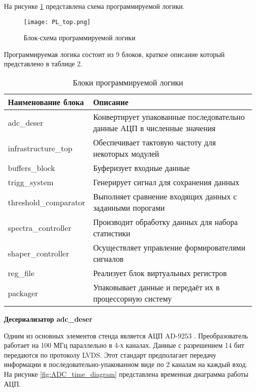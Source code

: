 На рисунке \ref{fig:PL_top} представлена схема программируемой логики.\par 
\begin{figure}[ht]
    \centering
    \texttt{[image: PL\_top.png]}
    \caption{Блок-схема программируемой логики}
    \label{fig:PL_top}
\end{figure}
Программируемая логика состоит из 9 блоков, краткое описание который представлено в таблице 2.\par%
\begin{table}[ht] \label{tab:PL_top_blocks}
    \caption{Блоки программируемой логики}
    \begin{tabular}{|p{}|p{}|}
        \hline
        Наименование блока & Описание \\
        \hline
        adc\_deser & Конвертирует упакованные последовательно данные АЦП в численные значения \\
        \hline
        infrastructure\_top & Обеспечивает тактовую частоту для некоторых модулей \\
        \hline
        buffers\_block & Буферизует входные данные \\
        \hline
        trigg\_system & Генерирует сигнал для сохранения данных \\
        \hline
        threshold\_comparator & Выполняет сравнение входящих данных с заданными порогами \\
        \hline
        spectra\_controller & Производит обработку данных для набора статистики \\
        \hline
        shaper\_controller & Осуществляет управление формирователями сигналов \\
        \hline
        reg\_file & Реализует блок виртуальных регистров \\
        \hline
        packager & Упаковывает данные и передаёт их в процессорную систему \\
        \hline
    \end{tabular}
\end{table}
\textbf{Десериализатор adc\_deser}\par
Одним из основных элементов стенда является АЦП AD-9253 \parencite{AD9253}. Преобразователь работает на 100 МГц параллельно в 4-х каналах. Данные с разрешением 14 бит передаются по протоколу LVDS. Этот стандарт предполагает передачу информации в последовательно-упакованном виде по 2 каналам на каждый вход. На рисунке \ref{fig:ADC_time_diagram} представлена временная диаграмма работы АЦП.\par
